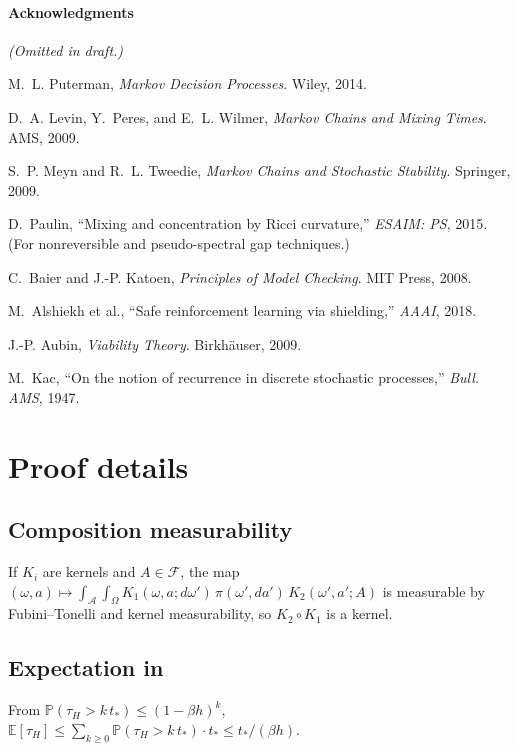 \documentclass[11pt]{article}
\theoremstyle{plain}
\theoremstyle{definition}
\theoremstyle{remark}
\newcommand{\Prb}{\mathbb{P}}
\newcommand{\E}{\mathbb{E}}
\newcommand{\A}{\mathcal{A}}
\newcommand{\F}{\mathcal{F}}
\begin{document}
\paragraph{Acknowledgments}
\emph{(Omitted in draft.)}

\begin{thebibliography}{9}

M.~L. Puterman, \emph{Markov Decision Processes}. Wiley, 2014.

D.~A. Levin, Y.~Peres, and E.~L. Wilmer, \emph{Markov Chains and Mixing Times}. AMS, 2009.

S.~P. Meyn and R.~L. Tweedie, \emph{Markov Chains and Stochastic Stability}. Springer, 2009.

D.~Paulin, ``Mixing and concentration by Ricci curvature,'' \emph{ESAIM: PS}, 2015. (For nonreversible and pseudo-spectral gap techniques.)

C.~Baier and J.-P. Katoen, \emph{Principles of Model Checking}. MIT Press, 2008.

M.~Alshiekh et al., ``Safe reinforcement learning via shielding,'' \emph{AAAI}, 2018.

J.-P. Aubin, \emph{Viability Theory}. Birkhäuser, 2009.

M.~Kac, ``On the notion of recurrence in discrete stochastic processes,'' \emph{Bull. AMS}, 1947.

\end{thebibliography}

\appendix

\section{Proof details}

\subsection*{Composition measurability}
If $K_i$ are kernels and $A\in \F$, the map $(\omega,a)\mapsto \int_\A \int_\Omega K_1(\omega,a;d\omega')\,\pi(\omega',da')\,K_2(\omega',a';A)$ is measurable by Fubini--Tonelli and kernel measurability, so $K_2\circ K_1$ is a kernel.

\subsection*{Expectation in \texorpdfstring{}{}}
From $\Prb(\tau_H>k\,t_*)\le (1-\beta h)^k$, $\E[\tau_H]\le \sum_{k\ge 0} \Prb(\tau_H>k\,t_*)\cdot t_* \le t_*/(\beta h)$.
\end{document}
